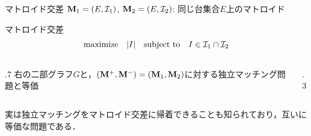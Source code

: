 \documentclass[14pt,aspectratio=169,xcolor=dvipsnames,table,onlytextwidth,dvipdfmx]{beamer}
\begin{document}
\begin{frame}{マトロイド交差}
    $\mathbf{M}_1 = (E, \mathcal{I}_1)$, $\mathbf{M}_2 = (E, \mathcal{I}_2)$: 同じ台集合$E$上のマトロイド

    \begin{block}{マトロイド交差}
        \[ 
        \text{maximize} \quad \lvert I\rvert \quad \text{subject to} \quad I \in \mathcal{I}_1 \cap \mathcal{I}_2
        \]
    \end{block}

    \pause
    \begin{columns}[T]
    \begin{column}{.7\textwidth}
        右の二部グラフ$G$と，$(\mathbf{M}^+, \mathbf{M}^-) = (\mathbf{M}_1, \mathbf{M}_2)$に対する独立マッチング問題と等価
    \end{column}
    \begin{column}{.3\textwidth}
        \centering\small
    \end{column}
    \end{columns}

    \vfill
    {\footnotesize {} 実は独立マッチングをマトロイド交差に帰着できることも知られており，互いに等価な問題である．}
\end{frame}
\end{document}
